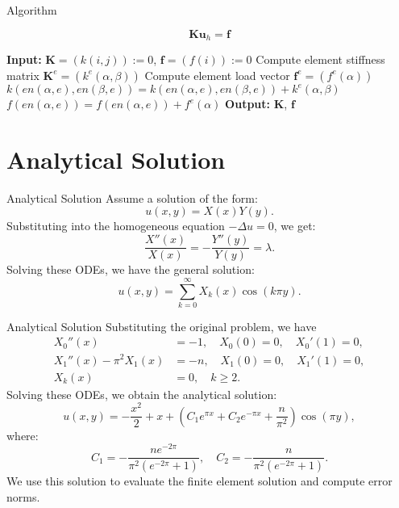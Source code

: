 \documentclass{beamer}
\begin{document}
\begin{frame}{Algorithm}

\begin{equation*}
\boldsymbol{K} \boldsymbol{u}_{h} = \boldsymbol{f} \label{eq:stiff}
\end{equation*}

\begin{algorithm}[H]
\caption{Algorithm for forming the stiffness matrix and load vector}
\begin{algorithmic}[1] %
    \State \textbf{Input:} $\boldsymbol{K} = (k(i, j)) := 0$, $\boldsymbol{f} = (f(i)) := 0$
        \State Compute element stiffness matrix $\boldsymbol{K}^{e} = \left(k^{e}(\alpha, \beta)\right)$
        \State Compute element load vector $\boldsymbol{f}^{e} = \left(f^{e}(\alpha)\right)$
            \State $k(e n(\alpha, e), e n(\beta, e)) = k(e n(\alpha, e), e n(\beta, e)) + k^{e}(\alpha, \beta)$
            \State $f(e n(\alpha, e)) = f(e n(\alpha, e)) + f^{e}(\alpha)$
        \EndFor
    \EndFor
    \State \textbf{Output:} $\boldsymbol{K}$, $\boldsymbol{f}$
\end{algorithmic}
\end{algorithm}

\end{frame}
\section{Analytical Solution}

\begin{frame}{Analytical Solution}
Assume a solution of the form:
\[
u(x, y) = X(x) Y(y).
\]
Substituting into the homogeneous equation \(-\Delta u = 0\), we get:
\[
\frac{X''(x)}{X(x)} = -\frac{Y''(y)}{Y(y)} = \lambda.
\]
Solving these ODEs, we have the general solution:
\[
u(x, y) = \sum_{k=0}^\infty X_k(x) \cos(k \pi y).
\]
\end{frame}

\begin{frame}{Analytical Solution}
Substituting the original problem, we have
\begin{align*}
X_0''(x) &= -1, \quad X_0(0) = 0, \quad X_0'(1) = 0, \\
X_1''(x) - \pi^2 X_1(x) &= -n, \quad X_1(0) = 0, \quad X_1'(1) = 0, \\
X_k(x) &= 0, \quad k \geq 2.
\end{align*}
Solving these ODEs, we obtain the analytical solution:
\[
u(x, y) = -\frac{x^2}{2} + x + \left(C_1 e^{\pi x} + C_2 e^{-\pi x} + \frac{n}{\pi^2}\right) \cos(\pi y),
\]
where:
\[
C_1 = -\frac{n e^{-2\pi}}{\pi^2(e^{-2\pi} + 1)}, \quad C_2 = -\frac{n}{\pi^2(e^{-2\pi} + 1)}.
\]
We use this solution to evaluate the finite element solution and compute error norms.
\end{frame}
\end{document}
